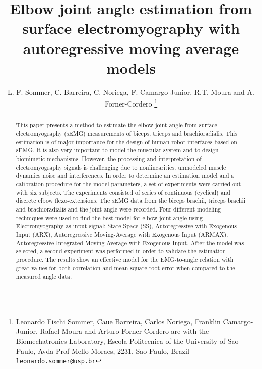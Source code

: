 \documentclass[letterpaper, 10 pt, conference]{ieeeconf}  %
\title{\LARGE \bf Elbow joint angle estimation from surface electromyography with autoregressive moving average models
}
\author{L. F. Sommer, C. Barreira, C. Noriega, F. Camargo-Junior, R.T. Moura and A. Forner-Cordero%
\thanks{Leonardo Fischi Sommer, Caue Barreira, Carlos Noriega, Franklin Camargo-Junior, Rafael Moura and Arturo Forner-Cordero are with the Biomechatronics Laboratory, Escola Politecnica of the University of Sao Paulo, Avda Prof Mello Moraes, 2231, Sao Paulo, Brazil {\tt\small leonardo.sommer@usp.br}}
}
\begin{document}
\maketitle
\thispagestyle{empty}
\pagestyle{empty}


\begin{abstract}


This paper presents a method to estimate the elbow joint angle from surface electromyography (sEMG) measurements of biceps, triceps and brachioradialis. This estimation is of major importance for the design of human robot interfaces based on sEMG. It is also very important to model the muscular system and to design biomimetic mechanisms. However, the processing and interpretation of electromyography signals is challenging due to nonlinearities, unmodeled muscle dynamics noise and interferences. In order to determine an estimation model and a calibration procedure for the model parameters, a set of experiments were carried out with six subjects. The experiments consisted of series of continuous (cyclical) and discrete elbow flexo-extensions. The sEMG data from the biceps brachii, triceps brachii and brachioradialis and the joint angle were recorded. Four different modeling techniques were used to find the best model for elbow joint angle using Electromyography as input signal: State Space (SS), Autoregressive with Exogenous Input (ARX), Autoregressive Moving-Average with Exogenous Input (ARMAX), Autoregressive Integrated Moving-Average with Exogenous Input. After the model was selected, a second experiment was performed in order to validate the estimation procedure. The results show an effective model for the EMG-to-angle relation with great values for both correlation and mean-square-root error when compared to the measured angle data.

\end{abstract}
\end{document}
